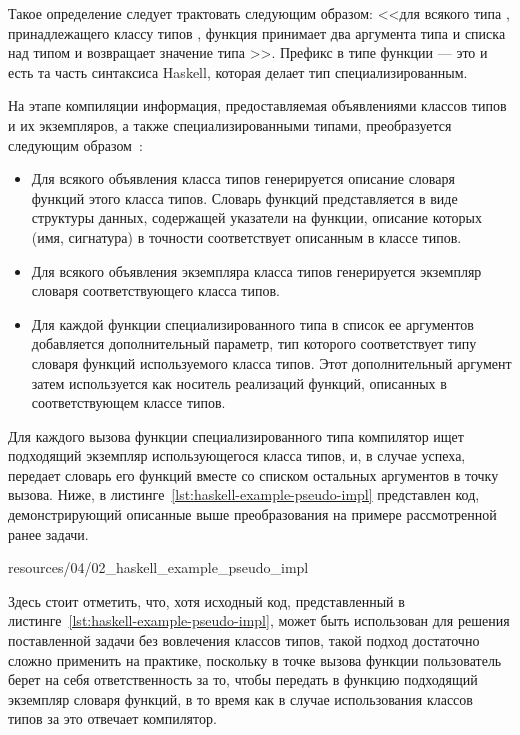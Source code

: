 Такое определение следует трактовать следующим образом: <<для всякого типа , принадлежащего классу типов , функция  принимает два аргумента типа  и списка над типом  и возвращает значение типа >>. Префикс  в типе функции  --- это и есть та часть синтаксиса Haskell, которая делает тип специализированным.

На этапе компиляции информация, предоставляемая объявлениями классов типов и их экземпляров, а также специализированными типами, преобразуется следующим образом~\cite{WadlerB89}:
\begin{itemize}
    \item Для всякого объявления класса типов генерируется описание словаря функций этого класса типов. Словарь функций представляется в виде структуры данных, содержащей указатели на функции, описание которых (имя, сигнатура) в точности соответствует описанным в классе типов. 
    \item Для всякого объявления экземпляра класса типов генерируется экземпляр словаря соответствующего класса типов. 
    \item Для каждой функции специализированного типа в список ее аргументов добавляется дополнительный параметр, тип которого соответствует типу словаря функций используемого класса типов. Этот дополнительный аргумент затем используется как носитель реализаций функций, описанных в соответствующем классе типов. 
\end{itemize}
Для каждого вызова функции специализированного типа компилятор ищет подходящий экземпляр использующегося класса типов, и, в случае успеха, передает словарь его функций вместе со списком остальных аргументов в точку вызова. Ниже, в листинге~\ref{lst:haskell-example-pseudo-impl} представлен код, демонстрирующий описанные выше преобразования на примере рассмотренной ранее задачи. 


{resources/04/02_haskell_example_pseudo_impl}

Здесь стоит отметить, что, хотя исходный код, представленный в листинге~\ref{lst:haskell-example-pseudo-impl}, может быть использован для решения поставленной задачи без вовлечения классов типов, такой подход достаточно сложно применить на практике, поскольку в точке вызова функции  пользователь берет на себя ответственность за то, чтобы передать в функцию подходящий экземпляр словаря функций, в то время как в случае использования классов типов за это отвечает компилятор. 

